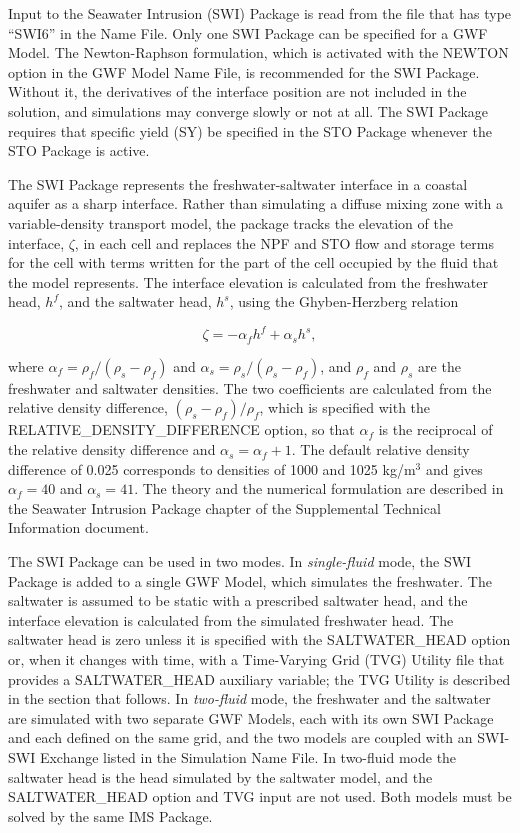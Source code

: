 Input to the Seawater Intrusion (SWI) Package is read from the file that has type ``SWI6'' in the Name File.  Only one SWI Package can be specified for a GWF Model.  The Newton-Raphson formulation, which is activated with the NEWTON option in the GWF Model Name File, is recommended for the SWI Package.  Without it, the derivatives of the interface position are not included in the solution, and simulations may converge slowly or not at all.  The SWI Package requires that specific yield (SY) be specified in the STO Package whenever the STO Package is active.

The SWI Package represents the freshwater-saltwater interface in a coastal aquifer as a sharp interface.  Rather than simulating a diffuse mixing zone with a variable-density transport model, the package tracks the elevation of the interface, $\zeta$, in each cell and replaces the NPF and STO flow and storage terms for the cell with terms written for the part of the cell occupied by the fluid that the model represents.  The interface elevation is calculated from the freshwater head, $h^f$, and the saltwater head, $h^s$, using the Ghyben-Herzberg relation

\begin{equation}
\zeta = -\alpha_f h^f + \alpha_s h^s,
\end{equation}

\noindent where $\alpha_f = \rho_f / (\rho_s - \rho_f)$ and $\alpha_s = \rho_s / (\rho_s - \rho_f)$, and $\rho_f$ and $\rho_s$ are the freshwater and saltwater densities.  The two coefficients are calculated from the relative density difference, $(\rho_s - \rho_f) / \rho_f$, which is specified with the RELATIVE\_DENSITY\_DIFFERENCE option, so that $\alpha_f$ is the reciprocal of the relative density difference and $\alpha_s = \alpha_f + 1$.  The default relative density difference of 0.025 corresponds to densities of 1000 and 1025 kg/m$^3$ and gives $\alpha_f = 40$ and $\alpha_s = 41$.  The theory and the numerical formulation are described in the Seawater Intrusion Package chapter of the Supplemental Technical Information document.

The SWI Package can be used in two modes.  In \textit{single-fluid} mode, the SWI Package is added to a single GWF Model, which simulates the freshwater.  The saltwater is assumed to be static with a prescribed saltwater head, and the interface elevation is calculated from the simulated freshwater head.  The saltwater head is zero unless it is specified with the SALTWATER\_HEAD option or, when it changes with time, with a Time-Varying Grid (TVG) Utility file that provides a SALTWATER\_HEAD auxiliary variable; the TVG Utility is described in the section that follows.  In \textit{two-fluid} mode, the freshwater and the saltwater are simulated with two separate GWF Models, each with its own SWI Package and each defined on the same grid, and the two models are coupled with an SWI-SWI Exchange listed in the Simulation Name File.  In two-fluid mode the saltwater head is the head simulated by the saltwater model, and the SALTWATER\_HEAD option and TVG input are not used.  Both models must be solved by the same IMS Package.

